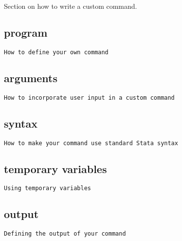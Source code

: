 
Section on how to write a custom command.

\subsection{program}

\texttt{How to define your own command}

\subsection{arguments}

\texttt{How to incorporate user input in a custom command}

\subsection{syntax}

\texttt{How to make your command use standard Stata syntax}

\subsection{temporary variables}

\texttt{Using temporary variables}

\subsection{output}

\texttt{Defining the output of your command}
